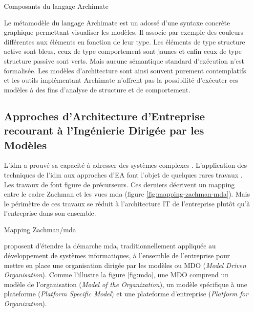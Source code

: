 \begin{table}[!ht]
    \vspace*{0.5em}
    \begin{center}
        
    \end{center}
 \caption{Composants du langage Archimate}
 \label{fig:archimate}
\end{table}

Le métamodèle du langage Archimate est un adossé d'une syntaxe concrète graphique permettant visualiser les modèles. Il associe par exemple des couleurs différentes aux éléments en fonction de leur type. Les éléments de type structure active sont bleus, ceux de type comportement sont jaunes et enfin ceux de type structure passive sont verts. Mais aucune sémantique standard d'exécution n'est formalisée. Les modèles d'architecture sont ainsi souvent purement contemplatifs et les outils implémentant Archimate n'offrent pas la possibilité d'exécuter ces modèles à des fins d'analyse de structure et de comportement. 

\subsection{Approches d'Architecture d'Entreprise recourant à l'Ingénierie Dirigée par les Modèles}

L'\gls{idm} a prouvé sa capacité à adresser des systèmes complexes \cite{france2007model}. L'application des techniques de l'\gls{idm} aux approches d'EA font l'objet de quelques rares travaux \cite{bruneliere2013support}. Les travaux de \cite{frankel2003zachman} font figure de précurseurs. Ces derniers décrivent un mapping entre le cadre Zachman et les vues \gls{mda} (figure \ref{fig:mapping-zachman-mda}). Mais le périmètre de ces travaux se réduit à l'architecture IT de l'entreprise plutôt qu'à l'entreprise dans son ensemble.

\begin{table}[!ht]
    \vspace*{0.5em}
    
    \caption{Mapping Zachman/\gls{mda} \protect\cite{frankel2003zachman}}
    \label{fig:mapping-zachman-mda}
\end{table}

\cite{clark_towards_2014} proposent d'étendre la démarche \gls{mda},  traditionnellement appliquée au développement de systèmes informatiques, à l'ensemble de l'entreprise pour mettre en place une organisation dirigée par les modèles ou MDO (\textit{Model Driven Organisation}). Comme l'illustre la figure \ref{fig:mdo}, une MDO comprend un modèle de l'organisation (\textit{Model of the Organization}), un modèle spécifique à une plateforme (\textit{Platform Specific Model}) et une plateforme d'entreprise (\textit{Platform for Organization}). 

